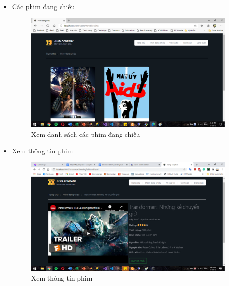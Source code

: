 \documentclass[a4paper, 12pt]{article}
\begin{document}
\begin{itemize}
	\item Các phim đang chiếu
	\begin{figure}[H]
		\begin{center}
			\includegraphics[scale=0.5]{./image/demo_nowShowing.png}
			\caption{Xem danh sách các phim đang chiếu}
		\end{center}
	\end{figure}

	\item Xem thông tin phim
	\begin{figure}[H]
		\begin{center}
			\includegraphics[scale=0.5]{./image/demo_movieDetail.png}
			\caption{Xem thông tin phim}
		\end{center}
	\end{figure}


\end{itemize}
\end{document}
